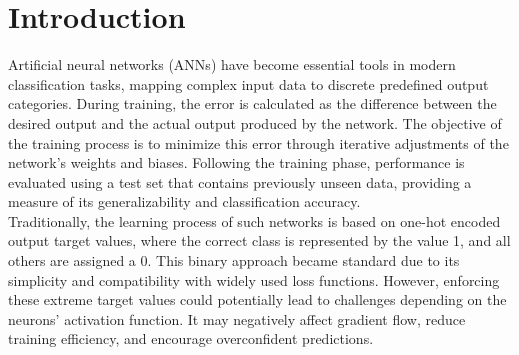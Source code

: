 \documentclass[12pt,fleqn,a4paper]{article}
\begin{document}

\vspace{4em}

\section{Introduction}
Artificial neural networks (ANNs) have become essential tools in modern classification tasks, mapping complex input data to discrete predefined output categories. During training, the error is calculated as the difference between the desired output and the actual output produced by the network. The objective of the training process is to minimize this error through iterative adjustments of the network's weights and biases. Following the training phase, performance is evaluated using a test set that contains previously unseen data, providing a measure of its generalizability and classification accuracy. \\

Traditionally, the learning process of such networks is based on one-hot encoded output target values, where the correct class is represented by the value 1, and all others are assigned a 0. This binary approach became standard due to its simplicity and compatibility with widely used loss functions. However, enforcing these extreme target values could potentially lead to challenges depending on the neurons' activation function. It may negatively affect gradient flow, reduce training efficiency, and encourage overconfident predictions. \\
\end{document}
